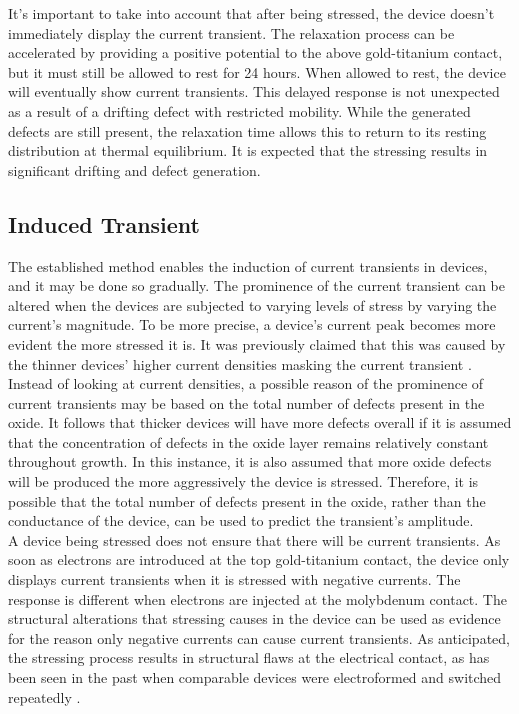 \noindent It's important to take into account that after being stressed, the device doesn't immediately display the current transient. The relaxation process can be accelerated by providing a positive potential to the above gold-titanium contact, but it must still be allowed to rest for 24 hours. When allowed to rest, the device will eventually show current transients. This delayed response is not unexpected as a result of a drifting defect with restricted mobility. While the generated defects are still present, the relaxation time allows this to return to its resting distribution at thermal equilibrium. It is expected that the stressing results in significant drifting and defect generation.

\subsection[Induced Transient]{Induced Transient}

The established method enables the induction of current transients in devices, and it may be done so gradually. The prominence of the current transient can be altered when the devices are subjected to varying levels of stress by varying the current's magnitude. To be more precise, a device's current peak becomes more evident the more stressed it is. It was previously claimed that this was caused by the thinner devices' higher current densities masking the current transient \cite{el2007ionic}. \\

\noindent Instead of looking at current densities, a possible reason of the prominence of current transients may be based on the total number of defects present in the oxide. It follows that thicker devices will have more defects overall if it is assumed that the concentration of defects in the oxide layer remains relatively constant throughout growth. In this instance, it is also assumed that more oxide defects will be produced the more aggressively the device is stressed. Therefore, it is possible that the total number of defects present in the oxide, rather than the conductance of the device, can be used to predict the transient's amplitude. \\

\noindent A device being stressed does not ensure that there will be current transients. As soon as electrons are introduced at the top gold-titanium contact, the device only displays current transients when it is stressed with negative currents. The response is different when electrons are injected at the molybdenum contact. The structural alterations that stressing causes in the device can be used as evidence for the reason only negative currents can cause current transients. As anticipated, the stressing process results in structural flaws at the electrical contact, as has been seen in the past when comparable devices were electroformed and switched repeatedly \cite{waser1990dcI,waser1990dcII}. \\

